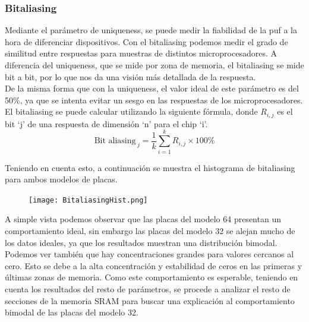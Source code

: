 \documentclass[spanish]{template/minim}
\begin{document}
\subsubsection{Bitaliasing}\label{sec:bitaliasing}

Mediante el parámetro de uniqueness, se puede medir la fiabilidad de la \gls{puf} a la hora de diferenciar dispositivos. Con el bitaliasing podemos medir el grado de similitud entre respuestas para muestras de distintos microprocesadores. A diferencia del uniqueness, que se mide por zona de memoria, el bitaliasing se mide bit a bit, por lo que nos da una visión más detallada de la respuesta.\\

De la misma forma que con la uniqueness, el valor ideal de este parámetro es del 50\%, ya que se intenta evitar un sesgo en las respuestas de los microprocesadores.\\

El bitaliasing se puede calcular utilizando la siguiente fórmula, donde $R_{i,j}$ es el bit `j' de una respuesta de dimensión `n' para el chip `i'.\\

\begin{equation}
    \text{Bit aliasing}_{\hspace{3pt} j} = \frac{1}{k} \sum\limits^k_{i=1} R_{i,j}\times 100\%
    \label{eq:bitaliasing}
\end{equation}

Teniendo en cuenta esto, a continuación se muestra el histograma de bitaliasing para ambos modelos de placas.\\

\begin{figure}[H]
    \centering
    \texttt{[image: BitaliasingHist.png]}
\end{figure}

A simple vista podemos observar que las placas del modelo 64 presentan un comportamiento ideal, sin embargo las placas del modelo 32 se alejan mucho de los datos ideales, ya que los resultados muestran una distribución bimodal.\\

Podemos ver también que hay concentraciones grandes para valores cercanos al cero. Esto se debe a la alta concentración y estabilidad de ceros en las primeras y últimas zonas de memoria. Como este comportamiento es esperable, teniendo en cuenta los resultados del resto de parámetros, se procede a analizar el resto de secciones de la memoria SRAM para buscar una explicación al comportamiento bimodal de las placas del modelo 32.\\
\end{document}
